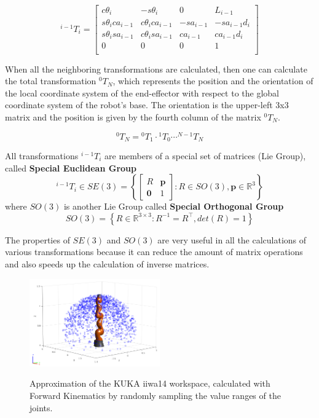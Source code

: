 \begin{equation}
^{i-1}T_i = 
\begin{bmatrix}
c\theta_i & -s\theta_i & 0 & L_{i-1} \\
s\theta_ica_{i-1} & c\theta_ica_{i-1} & -sa_{i-1} & -sa_{i-1}d_i \\
s\theta_isa_{i-1} & c\theta_isa_{i-1} & ca_{i-1} & ca_{i-1}d_i \\
0 & 0 & 0 & 1\\
\end{bmatrix}
\end{equation}

When all the neighboring transformations are calculated, then one can calculate the total transformation $^{0}T_N$, which represents the position and the 
orientation of the local coordinate system of the end-effector with respect to the global coordinate system of the robot's base. The orientation is the 
upper-left 3x3 matrix and the position is given by the fourth column of the matrix $^{0}T_N$.

\begin{equation}
^{0}T_N = {}^{0}T_1 \cdot {}^{1}T_0 \cdots {}^{N-1}T_N
\end{equation}

All transformations $^{i-1}T_i$ are members of a special set of matrices (Lie Group), called \textbf{Special Euclidean Group}
\[
^{i-1}T_i \in SE(3) = \left\lbrace \begin{bmatrix}
R & \mathbf{p}\\
\mathbf{0} & 1
\end{bmatrix} : R \in SO(3), \mathbf{p} \in \mathbb{R}^{3} \right\rbrace
\]
where $SO(3)$ is another Lie Group called \textbf{Special Orthogonal Group}
\[
SO(3) = \left\lbrace R \in \mathbb{R}^{3 \times 3}: R^{-1}=R^\top, det(R)=1 \right\rbrace
\]

The properties of $SE(3)$ and $SO(3)$ are very useful in all the calculations of various transformations because it can reduce the amount of matrix operations and also speeds up the calculation 
of inverse matrices.

\begin{center}
\begin{figure}[H]
\centering
\includegraphics[width=0.5\textwidth]{images/workspace_sampling_1e3.png}\\
\caption{Approximation of the KUKA iiwa14 workspace, calculated with Forward Kinematics by randomly sampling the value ranges of the joints.}
\end{figure}
\end{center}

